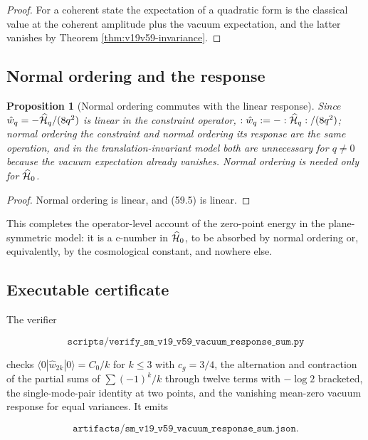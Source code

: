 \documentclass[11pt]{article}
\newtheorem{proposition}[theorem]{Proposition}
\theoremstyle{remark}
\begin{document}
\begin{proof}
For a coherent state the expectation of a quadratic form is the
classical value at the coherent amplitude plus the vacuum expectation,
and the latter vanishes by Theorem \ref{thm:v19v59-invariance}.
\end{proof}

\subsection{Normal ordering and the response}

\begin{proposition}[Normal ordering commutes with the linear response]
\label{prop:v19v59-no}
Since \(\hat w_q=-\widehat{\cal H}_q/(8q^2)\) is linear in the constraint
operator, \(:\hat w_q:=-:\widehat{\cal H}_q:/(8q^2)\); normal ordering
the constraint and normal ordering its response are the same
operation, and in the translation-invariant model both are
unnecessary for \(q\neq0\) because the vacuum expectation already
vanishes.  Normal ordering is needed only for \(\widehat{\cal H}_0\).
\end{proposition}

\begin{proof}
Normal ordering is linear, and (59.5) is linear.
\end{proof}

This completes the operator-level account of the zero-point energy in
the plane-symmetric model: it is a c-number in \(\widehat{\cal H}_0\), to
be absorbed by normal ordering or, equivalently, by the cosmological
constant, and nowhere else.

\subsection{Executable certificate}

The verifier

\[
 \texttt{scripts/verify\_sm\_v19\_v59\_vacuum\_response\_sum.py}     \tag{62.2}
\]

checks \(\langle0|\hat w_{2k}|0\rangle=C_0/k\) for \(k\leq3\) with
\(c_g=3/4\), the alternation and contraction of the partial sums of
\(\sum(-1)^k/k\) through twelve terms with \(-\log2\) bracketed, the
single-mode-pair identity at two points, and the vanishing mean-zero
vacuum response for equal variances.  It emits

\[
 \texttt{artifacts/sm\_v19\_v59\_vacuum\_response\_sum.json}.        \tag{62.3}
\]
\end{document}
